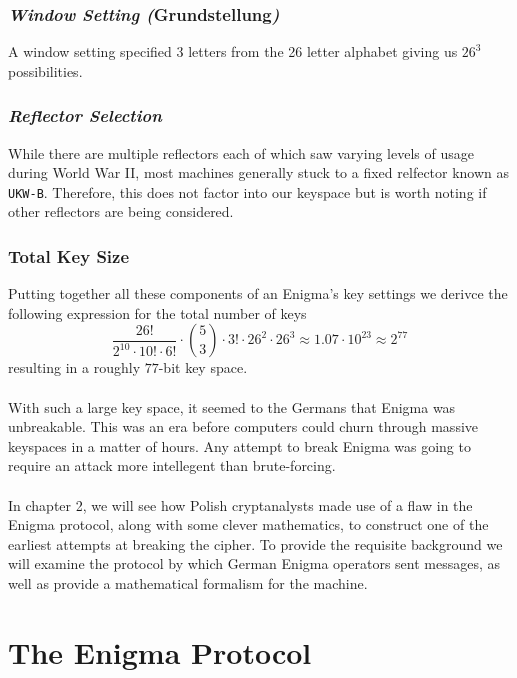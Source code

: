\subsubsection{\emph{Window Setting (}Grundstellung\emph{)}}
A window setting specified 3 letters from the 26 letter alphabet
giving us $26^3$ possibilities.

\subsubsection{\emph{Reflector Selection}}
While there are multiple reflectors each of which saw varying levels
of usage during World War II, most machines generally stuck to a
fixed relfector known as \texttt{UKW-B}. Therefore, this does not
factor into our keyspace but is worth noting if other reflectors are
being considered.

\subsubsection{Total Key Size}
Putting together all these components of an Enigma's key settings we
derivce the following expression for the total number of keys
\[
  \frac{26!}{2^{10}\cdot 10! \cdot 6!}\cdot{5\choose 3}\cdot3!\cdot
  26^2\cdot 26^3 \approx 1.07 \cdot 10^{23} \approx 2^{77}
\]
resulting in a roughly $77$-bit key space.
\\\\With such a large key space, it seemed to the Germans that Enigma
was unbreakable. This was an era before computers could churn through
massive keyspaces in a matter of hours. Any attempt to break Enigma
was going to require an attack more intellegent than brute-forcing.
\\\\In chapter 2, we will see how Polish cryptanalysts made use of a
flaw in the Enigma protocol, along with some clever mathematics, to
construct one of the earliest attempts at breaking the cipher. To
provide the requisite background we will examine the protocol by
which German Enigma operators sent messages, as well as provide a
mathematical formalism for the machine.

\section{The Enigma Protocol}

